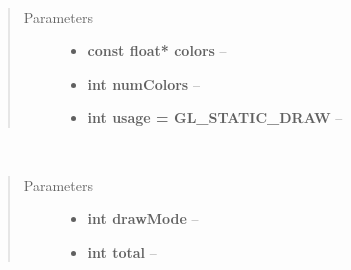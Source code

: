 \documentclass[letterpaper,10pt,english]{sphinxmanual}
\begin{document}
\begin{fulllineitems}
\label{gl:VBO::setColors__floatCP.i.i}~\begin{quote}\begin{description}
\item[{Parameters}] \leavevmode\begin{itemize}
\item {} 
\textbf{const float* colors} -- 

\item {} 
\textbf{int numColors} -- 

\item {} 
\textbf{int usage = GL\_STATIC\_DRAW} -- 

\end{itemize}

\end{description}\end{quote}

\end{fulllineitems}


\begin{fulllineitems}
\label{gl:VBO::bind}
\end{fulllineitems}


\begin{fulllineitems}
\label{gl:VBO::unbind}
\end{fulllineitems}


\begin{fulllineitems}
\label{gl:VBO::drawElements__i.i}~\begin{quote}\begin{description}
\item[{Parameters}] \leavevmode\begin{itemize}
\item {} 
\textbf{int drawMode} -- 

\item {} 
\textbf{int total} -- 

\end{itemize}

\end{description}\end{quote}

\end{fulllineitems}
\end{document}
